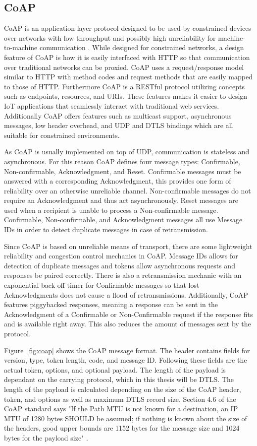 \documentclass[0-thesis.tex]{subfiles}
\begin{document}
\subsection{CoAP}
\label{ssec:coap}
CoAP is an application layer protocol designed to be used by constrained devices over
networks with low throughput and possibly high unreliability for machine-to-machine
communication \parencite{rfc7252}. While designed for constrained networks, a design
feature of CoAP is how it is easily interfaced with HTTP so that communication over
traditional networks can be proxied. CoAP uses a request/response model similar to HTTP
with method codes and request methods that are easily mapped to those of HTTP. Furthermore
CoAP is a RESTful protocol utilizing concepts such as endpoints, resources, and URIs.
These features makes it easier to design IoT applications that seamlessly interact with
traditional web services. Additionally CoAP offers features such as multicast support,
asynchronous messages, low header overhead, and UDP and DTLS bindings which are all
suitable for constrained environments.

As CoAP is usually implemented on top of UDP, communication is stateless and asynchronous.
For this reason CoAP defines four message types: Confirmable, Non-confirmable,
Acknowledgment, and Reset. Confirmable messages must be answered with a corresponding
Acknowledgment, this provides one form of reliability over an otherwise unreliable
channel. Non-confirmable messages do not require an Acknowledgment and thus act
asynchronously. Reset messages are used when a recipient is unable to process a
Non-confirmable message. Confirmable, Non-confirmable, and Acknowledgment messages all use
Message IDs in order to detect duplicate messages in case of retransmission.

Since CoAP is based on unreliable means of transport, there are some lightweight
reliability and congestion control mechanics in CoAP. Message IDs allows for detection of
duplicate messages and tokens allow asynchronous requests and responses be paired
correctly. There is also a retransmission mechanic with an exponential back-off timer for
Confirmable messages so that lost Acknowledgments does not cause a flood of
retransmissions. Additionally, CoAP features piggybacked responses, meaning a response can
be sent in the Acknowledgment of a Confirmable or Non-Confirmable request if the response
fits and is available right away. This also reduces the amount of messages sent by the
protocol.

Figure~\ref{fig:coap} shows the CoAP message format. The header contains fields for
version, type, token length, code, and message ID. Following these fields are the actual
token, options, and optional payload. The length of the payload is dependant on the
carrying protocol, which in this thesis will be DTLS. The length of the payload is
calculated depending on the size of the CoAP header, token, and options as well as maximum
DTLS record size. Section 4.6 of the CoAP standard says "If the Path MTU is not known for
a destination, an IP MTU of 1280 bytes SHOULD be assumed; if nothing is known about the
size of the headers, good upper bounds are 1152 bytes for the message size and 1024 bytes
for the payload size" \parencite{rfc7252}.
\end{document}
